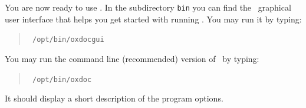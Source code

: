 You are now ready to use \oxdoc. In the subdirectory {\tt bin}
you can find the \oxdoc~graphical user interface that helps you get started
with running \oxdoc. You may run it by typing:
\begin{quote}\tt
/opt/bin/oxdocgui
\end{quote}
You may run the command line (recommended) version of \oxdoc~by typing:
\begin{quote}\tt
/opt/bin/oxdoc
\end{quote}
It should display a short description of the program options.




